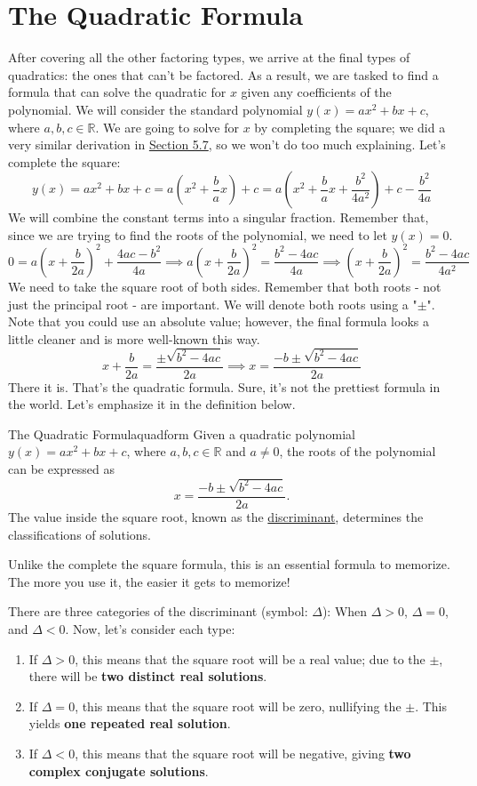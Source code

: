 \documentclass[lang=en,11pt]{elegantbook}
\begin{document}
\section{The Quadratic Formula}
\noindent After covering all the other factoring types, we arrive at the final types of quadratics: the ones that can't be factored.  As a result, we are tasked to find a formula that can solve the quadratic for $x$ given any coefficients of the polynomial.  We will consider the standard polynomial $y(x)=ax^2+bx+c$, where $a,b,c\in\mathbb{R}$.  We are going to solve for $x$ by completing the square; we did a very similar derivation in \hyperlink{section.5.7}{Section 5.7}, so we won't do too much explaining.  Let's complete the square:
$$y(x)=ax^2+bx+c=a\left(x^2+\frac{b}{a}x\right)+c=a\left(x^2+\frac{b}{a}x+\frac{b^2}{4a^2}\right)+c-\frac{b^2}{4a}$$
We will combine the constant terms into a singular fraction.  Remember that, since we are trying to find the roots of the polynomial, we need to let $y(x)=0$.
$$0=a\left(x+\frac{b}{2a}\right)^2+\frac{4ac-b^2}{4a} \implies a\left(x+\frac{b}{2a}\right)^2=\frac{b^2-4ac}{4a} \implies \left(x+\frac{b}{2a}\right)^2=\frac{b^2-4ac}{4a^2}$$
We need to take the square root of both sides.  Remember that both roots - not just the principal root - are important.  We will denote both roots using a "$\pm$".  Note that you could use an absolute value; however, the final formula looks a little cleaner and is more well-known this way.
$$x+\frac{b}{2a}=\frac{\pm\sqrt{b^2-4ac}}{2a} \implies x=\frac{-b\pm\sqrt{b^2-4ac}}{2a}$$
There it is.  That's the quadratic formula.  Sure, it's not the prettiest formula in the world.  Let's emphasize it in the definition below.
\begin{definition}{The Quadratic Formula}{quadform}
Given a quadratic polynomial $y(x)=ax^2+bx+c$, where $a,b,c\in\mathbb{R}$ and $a\neq 0$, the roots of the polynomial can be expressed as $$x=\frac{-b\pm\sqrt{b^2-4ac}}{2a}.$$
The value inside the square root, known as the \underline{discriminant}, determines the classifications of solutions.
\end{definition}
\begin{remark}
  Unlike the complete the square formula, this is an essential formula to memorize.  The more you use it, the easier it gets to memorize!
\end{remark}
There are three categories of the discriminant (symbol: $\Delta$): When $\Delta>0$, $\Delta=0$, and $\Delta<0$.  Now, let's consider each type: \begin{enumerate}
    \item If $\Delta>0$, this means that the square root will be a real value; due to the $\pm$, there will be \textbf{two distinct real solutions}.
    \item If $\Delta=0$, this means that the square root will be zero, nullifying the $\pm$.  This yields \textbf{one repeated real solution}.
    \item If $\Delta<0$, this means that the square root will be negative, giving \textbf{two complex conjugate solutions}.
\end{enumerate}
\end{document}
